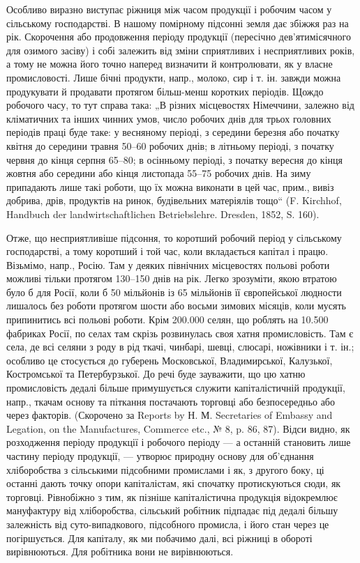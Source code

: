 Особливо виразно виступає ріжниця між часом продукції і робочим
часом у сільському господарстві. В нашому помірному підсонні земля дає
збіжжя раз на рік. Скорочення або продовження періоду продукції (пересічно
дев’ятимісячного для озимого засіву) і собі залежить від зміни
сприятливих і несприятливих років, а тому не можна його точно наперед
визначити й контролювати, як у власне промисловості. Лише бічні продукти,
напр., молоко, сир і т. ін. завжди можна продукувати й продавати
протягом більш-менш коротких періодів. Щождо робочого часу, то тут
справа така: „В різних місцевостях Німеччини, залежно від кліматичних
та інших чинних умов, число робочих днів для трьох головних періодів
праці буде таке: у весняному періоді, з середини березня або початку
квітня до середини травня 50--60 робочих днів; в літньому періоді, з початку
червня до кінця серпня 65--80; в осінньому періоді, з початку
вересня до кінця жовтня або середини або кінця листопада 55--75 робочих
днів. На зиму припадають лише такі роботи, що їх можна виконати
в цей час, прим., вивіз добрива, дрів, продуктів на ринок, будівельних
матеріялів тощо“ (F. Kirchhof, Handbuch der landwirtschaftlichen
Betriebslehre. Dresden, 1852, S. 160).

Отже, що несприятливіше підсоння, то коротший робочий період у
сільському господарстві, а тому коротший і той час, коли вкладається
капітал і працю. Візьмімо, напр., Росію. Там у деяких північних місцевостях
польові роботи можливі тільки протягом 130--150 днів на рік.
Легко зрозуміти, якою втратою було б для Росії, коли б 50 мільйонів
із 65 мільйонів її європейської людности лишалось без роботи протягом
шости або восьми зимових місяців, коли мусять припинитись всі польові
роботи. Крім \num{200.000} селян, що роблять на \num{10.500} фабриках Росії, по
селах там скрізь розвинулась своя хатня промисловість. Там є села, де
всі селяни з роду в рід ткачі, чинбарі, шевці, слюсарі, ножівники і т.
ін.; особливо це стосується до губерень Московської, Владимирської, Калузької,
Костромської та Петербурзької. До речі буде зауважити, що цю
хатню промисловість дедалі більше примушується служити капіталістичній
продукції, напр., ткачам основу та піткання постачають торговці або
безпосередньо або через факторів. (Скорочено за Reports by Н. М. Secretaries
of Embassy and Legation, on the Manufactures, Commerce etc.,
№ 8, p. 86, 87). Відси видно, як розходження періоду продукції і робочого
періоду — а останній становить лише частину періоду продукції, —
утворює природну основу для об’єднання хліборобства з сільськими підсобними
промислами і як, з другого боку, ці останні дають точку опори
капіталістам, які спочатку протискуються сюди, як торговці. Рівнобіжно
з тим, як пізніше капіталістична продукція відокремлює мануфактуру від
хліборобства, сільський робітник підпадає під дедалі більшу залежність
від суто-випадкового, підсобного промисла, і його стан через це погіршується.
Для капіталу, як ми побачимо далі, всі ріжниці в обороті вирівнюються.
Для робітника вони не вирівнюються.

